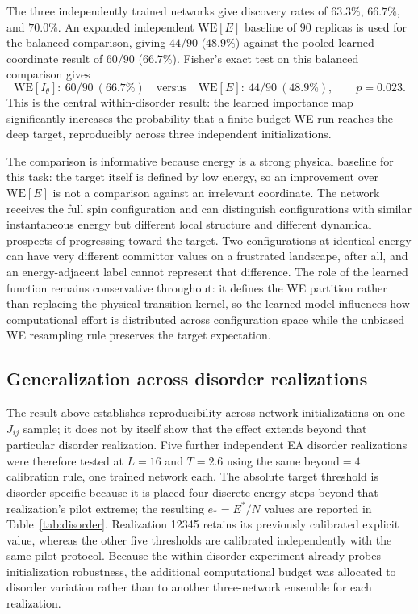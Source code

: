 \documentclass[a4paper,fleqn]{cas-sc}
\newcommand{\WE}{\mathrm{WE}}
\begin{document}
The three independently trained networks give discovery rates of $63.3\%$, $66.7\%$, and
$70.0\%$. An expanded independent $\WE[E]$ baseline of $90$ replicas is used for the balanced
comparison, giving $44/90$ ($48.9\%$) against the pooled learned-coordinate result of $60/90$
($66.7\%$). Fisher's exact test on this balanced comparison gives
\begin{equation}
\WE[I_\theta]:\ 60/90\ (66.7\%)\quad\text{versus}\quad\WE[E]:\ 44/90\ (48.9\%),\qquad p=0.023.
\label{eq:withinp}
\end{equation}
This is the central within-disorder result: the learned importance map significantly increases
the probability that a finite-budget WE run reaches the deep target, reproducibly across three
independent initializations.

The comparison is informative because energy is a strong physical baseline for this task: the
target itself is defined by low energy, so an improvement over $\WE[E]$ is not a comparison
against an irrelevant coordinate. The network receives the full spin configuration and can
distinguish configurations with similar instantaneous energy but different local structure and
different dynamical prospects of progressing toward the target. Two configurations at
identical energy can have very different committor values on a frustrated landscape, after
all, and an energy-adjacent label cannot represent that difference. The role of the learned
function remains conservative throughout: it defines the WE partition rather than replacing
the physical transition kernel, so the learned model influences how computational effort is
distributed across configuration space while the unbiased WE resampling rule preserves the
target expectation.

\subsection{Generalization across disorder realizations}\label{sec:disordergen}
The result above establishes reproducibility across network initializations on one $J_{ij}$
sample; it does not by itself show that the effect extends beyond that particular disorder
realization. Five further independent EA disorder realizations were therefore tested at
$L=16$ and $T=2.6$ using the same beyond$=4$ calibration rule, one trained network each.  The
absolute target threshold is disorder-specific because it is placed four discrete energy steps
beyond that realization's pilot extreme; the resulting $e_*=E^*/N$ values are reported in
Table~\ref{tab:disorder}.  Realization 12345 retains its previously calibrated explicit value,
whereas the other five thresholds are calibrated independently with the same pilot protocol.
Because the within-disorder experiment already probes initialization robustness, the additional
computational budget was allocated to disorder variation rather than to another three-network
ensemble for each realization.
\end{document}
